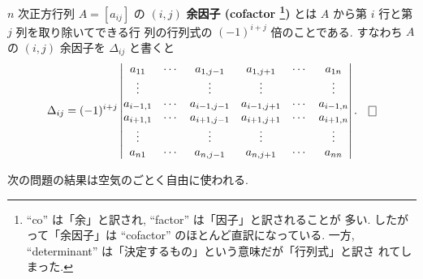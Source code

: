 \documentclass[12pt,twoside]{jarticle}
\begin{document}
\begin{definition}[余因子]
  \label{def:cofactor}
  $n$ 次正方行列 $A=[a_{ij}]$ の $(i,j)$ {\bf 余因子 (cofactor%
    \footnote{``co'' は「余」と訳され, ``factor'' は「因子」と訳されることが
      多い.  したがって「余因子」は ``cofactor'' のほとんど直訳になっている.
      一方, ``determinant'' は「決定するもの」という意味だが「行列式」と訳さ
      れてしまった.})} とは $A$ から第 $i$ 行と第 $j$ 列を取り除いてできる行
  列の行列式の $(-1)^{i+j}$ 倍のことである.
  すなわち $A$ の $(i,j)$ 余因子を $\Delta_{ij}$ と書くと
  \begin{equation*}
    \Delta_{ij} = 
    (-1)^{i+j}
    \begin{vmatrix}
      a_{11}    & \cdots & a_{1,j-1}   & a_{1,j+1}   & \cdots & a_{1n} \\
      \vdots    &        & \vdots      & \vdots      &        & \vdots \\
      a_{i-1,1} & \cdots & a_{i-1,j-1} & a_{i-1,j+1} & \cdots & a_{i-1,n} \\
      a_{i+1,1} & \cdots & a_{i+1,j-1} & a_{i+1,j+1} & \cdots & a_{i+1,n} \\
      \vdots    &        & \vdots      & \vdots      &        & \vdots \\
      a_{n1}    & \cdots & a_{n,j-1}   & a_{n,j+1}   & \cdots & a_{nn} \\
    \end{vmatrix}.
    \qed
  \end{equation*}
\end{definition}

次の問題の結果は空気のごとく自由に使われる.
\end{document}
